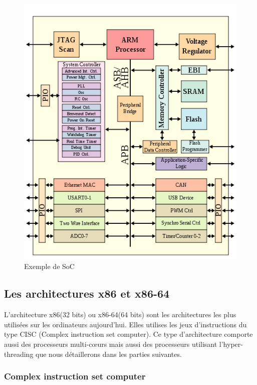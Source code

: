 \begin{figure}[h!]
\begin{center}
	\includegraphics[scale=0.9]{ARMSoCBlockDiagram.png}
	\caption{Exemple de SoC}
\end{center}
\end{figure}

\clearpage

\subsection{ Les architectures x86 et x86-64 }

L'architecture x86(32 bits) ou x86-64(64 bits) sont les architectures les plus utilisées sur les ordinateurs aujourd'hui. Elles utilises les jeux d'instructions du type CISC (Complex instruction set computer). Ce type d'architecture comporte aussi des processeurs multi-cœurs mais aussi des processeurs utilisant l'hyper-threading que nous détaillerons dans les parties suivantes.

\subsubsection{ Complex instruction set computer }

